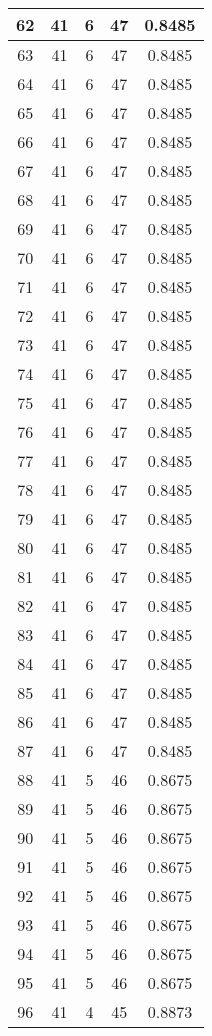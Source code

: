 \documentclass[letterpaper, 12pt]{article}
\begin{document}
\begin{longtable}{|c|c|c|c|c|}
\hline
62 & 41 & 6 & 47 & 0.8485 \\
\hline
63 & 41 & 6 & 47 & 0.8485 \\
\hline
64 & 41 & 6 & 47 & 0.8485 \\
\hline
65 & 41 & 6 & 47 & 0.8485 \\
\hline
66 & 41 & 6 & 47 & 0.8485 \\
\hline
67 & 41 & 6 & 47 & 0.8485 \\
\hline
68 & 41 & 6 & 47 & 0.8485 \\
\hline
69 & 41 & 6 & 47 & 0.8485 \\
\hline
70 & 41 & 6 & 47 & 0.8485 \\
\hline
71 & 41 & 6 & 47 & 0.8485 \\
\hline
72 & 41 & 6 & 47 & 0.8485 \\
\hline
73 & 41 & 6 & 47 & 0.8485 \\
\hline
74 & 41 & 6 & 47 & 0.8485 \\
\hline
75 & 41 & 6 & 47 & 0.8485 \\
\hline
76 & 41 & 6 & 47 & 0.8485 \\
\hline
77 & 41 & 6 & 47 & 0.8485 \\
\hline
78 & 41 & 6 & 47 & 0.8485 \\
\hline
79 & 41 & 6 & 47 & 0.8485 \\
\hline
80 & 41 & 6 & 47 & 0.8485 \\
\hline
81 & 41 & 6 & 47 & 0.8485 \\
\hline
82 & 41 & 6 & 47 & 0.8485 \\
\hline
83 & 41 & 6 & 47 & 0.8485 \\
\hline
84 & 41 & 6 & 47 & 0.8485 \\
\hline
85 & 41 & 6 & 47 & 0.8485 \\
\hline
86 & 41 & 6 & 47 & 0.8485 \\
\hline
87 & 41 & 6 & 47 & 0.8485 \\
\hline
88 & 41 & 5 & 46 & 0.8675 \\
\hline
89 & 41 & 5 & 46 & 0.8675 \\
\hline
90 & 41 & 5 & 46 & 0.8675 \\
\hline
91 & 41 & 5 & 46 & 0.8675 \\
\hline
92 & 41 & 5 & 46 & 0.8675 \\
\hline
93 & 41 & 5 & 46 & 0.8675 \\
\hline
94 & 41 & 5 & 46 & 0.8675 \\
\hline
95 & 41 & 5 & 46 & 0.8675 \\
\hline
96 & 41 & 4 & 45 & 0.8873 \\

\end{longtable}
\end{document}
